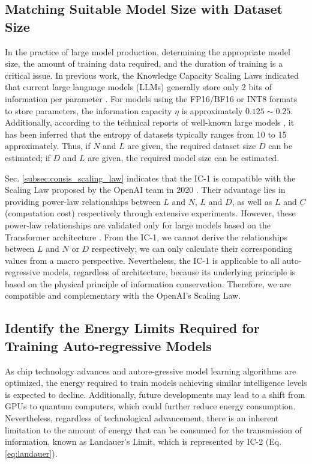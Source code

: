 \documentclass{article}
\theoremstyle{plain}
\theoremstyle{definition}
\theoremstyle{remark}
\begin{document}
\subsection{Matching Suitable Model Size with Dataset Size}\label{subsec:match}

In the practice of large model production, determining the appropriate model size, the amount of training data required, and the duration of training is a critical issue. In previous work, the Knowledge Capacity Scaling Laws indicated that current large language models (LLMs) generally store only 2 bits of information per parameter \cite{allenzhu2024physicslanguagemodels33}. For models using the FP16/BF16 or INT8 formats to store parameters, the information capacity $\eta$ is approximately $0.125 \sim 0.25$. Additionally, according to the technical reports of well-known large models \cite{ScalingLaw1_2020}, it has been inferred that the entropy of datasets typically ranges from 10 to 15 approximately. Thus, if $N$ and $L$ are given, the required dataset size $D$ can be estimated; if $D$ and $L$ are given, the required model size can be estimated.

Sec. \ref{subsec:consis_scaling_law} indicates that the IC-1 is compatible with the Scaling Law proposed by the OpenAI team in 2020 \cite{ScalingLaw1_2020}. Their advantage lies in providing power-law relationships between $L$ and $N$, $L$ and $D$, as well as $L$ and $C$ (computation cost) respectively through extensive experiments. However, these power-law relationships are validated only for large models based on the Transformer architecture \cite{NIPS2017_3f5ee243}. From the IC-1, we cannot derive the relationships between $L$ and $N$ or $D$ respectively; we can only calculate their corresponding values from a macro perspective. Nevertheless, the IC-1 is applicable to all auto-regressive models, regardless of architecture, because its underlying principle is based on the physical principle of information conservation. Therefore, we are compatible and complementary with the OpenAI's Scaling Law.

\subsection{Identify the Energy Limits Required for Training Auto-regressive Models}

As chip technology advances and autore-gressive model learning algorithms are optimized, the energy required to train models achieving similar intelligence levels is expected to decline. Additionally, future developments may lead to a shift from GPUs to quantum computers, which could further reduce energy consumption. Nevertheless, regardless of technological advancement, there is an inherent limitation to the amount of energy that can be consumed for the transmission of information, known as Landauer's Limit, which is represented by IC-2 (Eq. \ref{eq:landauer}).
\end{document}
